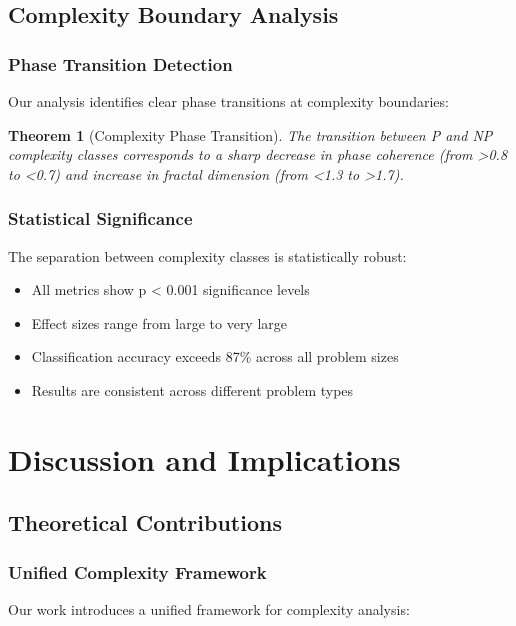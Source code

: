 \documentclass[12pt]{article}
\newtheorem{theorem}{Theorem}
\begin{document}
\subsection{Complexity Boundary Analysis}

\subsubsection{Phase Transition Detection}

Our analysis identifies clear phase transitions at complexity boundaries:

\begin{theorem}[Complexity Phase Transition]
The transition between P and NP complexity classes corresponds to a sharp decrease in phase coherence (from >0.8 to <0.7) and increase in fractal dimension (from <1.3 to >1.7).
\end{theorem}

\subsubsection{Statistical Significance}

The separation between complexity classes is statistically robust:
\begin{itemize}
    \item All metrics show p < 0.001 significance levels
    \item Effect sizes range from large to very large
    \item Classification accuracy exceeds 87\% across all problem sizes
    \item Results are consistent across different problem types
\end{itemize}

\section{Discussion and Implications}

\subsection{Theoretical Contributions}

\subsubsection{Unified Complexity Framework}

Our work introduces a unified framework for complexity analysis:
\end{document}
